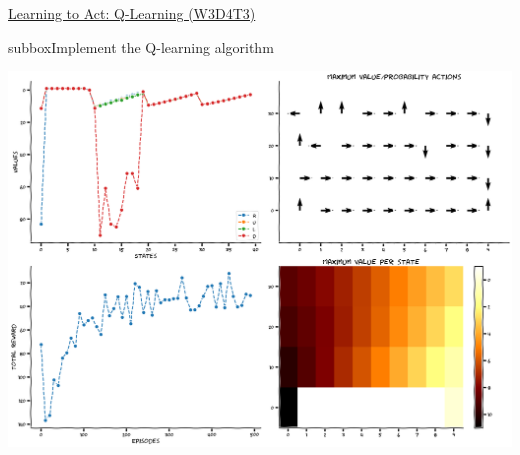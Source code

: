 \begin{textbox}{\href{https://compneuro.neuromatch.io/tutorials/W3D4_ReinforcementLearning/student/W3D4_Tutorial3.html}{Learning to Act: Q-Learning (W3D4T3)} }
\begin{subbox}{subbox}{Implement the Q-learning algorithm}
\begin{center}
    
\includegraphics[scale=0.15]{Figures/RL/RL_Figure15.png}
\end{center}



\end{subbox}
\end{textbox}
\newpage
